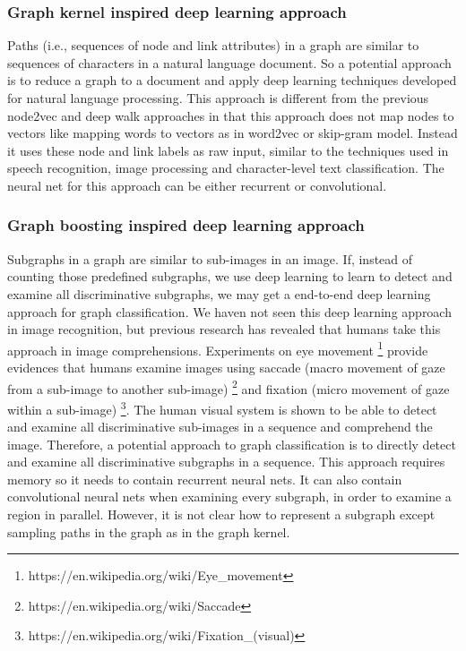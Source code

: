\documentclass{article}
\begin{document}
\subsubsection{Graph kernel inspired deep learning approach}
Paths (i.e., sequences of node and link attributes) in a graph are similar to
sequences of characters in a natural language document.
So a potential approach is to reduce a graph to a document and apply deep learning techniques developed for natural language processing.
This approach is different from the previous node2vec and deep walk approaches
in that this approach does not map nodes to vectors like mapping words to vectors
as in word2vec or skip-gram model.
Instead it uses these node and link labels as raw input,
similar to the techniques used in speech recognition, image processing and
character-level text classification.
The neural net for this approach can be either recurrent or convolutional.

\subsubsection{Graph boosting inspired deep learning approach}
Subgraphs in a graph are similar to sub-images in an image.
If, instead of counting those predefined subgraphs,
we use deep learning to learn to detect and examine all discriminative subgraphs,
we may get a end-to-end deep learning approach for graph classification.
We haven not seen this deep learning approach in image recognition,
but previous research has revealed 
that humans take this approach in image comprehensions.
Experiments on eye movement \footnote{https://en.wikipedia.org/wiki/Eye\_movement}
provide evidences that humans examine images using
saccade (macro movement of gaze from a sub-image to another sub-image)
\footnote{https://en.wikipedia.org/wiki/Saccade} and
fixation (micro movement of gaze within a sub-image)
\footnote{https://en.wikipedia.org/wiki/Fixation\_(visual)}.
The human visual system is shown to be able to detect and examine all discriminative
sub-images in a sequence and comprehend the image.
Therefore, a potential approach to graph classification is
to directly detect and examine all discriminative subgraphs in a sequence.
This approach requires memory so it needs to contain recurrent neural nets.
It can also contain convolutional neural nets when examining every subgraph,
in order to examine a region in parallel.
However, it is not clear how to represent a subgraph
except sampling paths in the graph as in the graph kernel.
\end{document}
